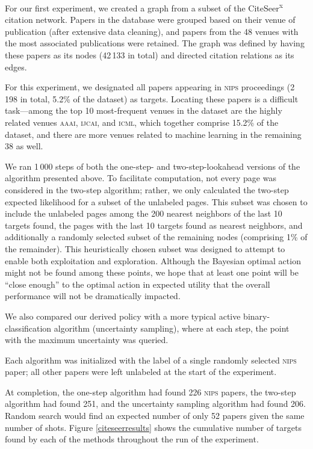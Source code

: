 \documentclass{acm_proc_article-sp}
\begin{document}
For our first experiment, we created a graph from a subset of the
CiteSeer\textsuperscript{x}\,citation network.  Papers in the database
were grouped based on their venue of publication (after extensive data
cleaning), and papers from the 48 venues with the most associated
publications were retained.  The graph was defined by having these
papers as its nodes (42\,133 in total) and directed citation
relations as its edges.

For this experiment, we designated all papers appearing in
\textsc{nips} proceedings (2\,198 in total, 5.2\% of the dataset) as
targets.  Locating these papers is a difficult task---among the top 10
most-frequent venues in the dataset are the highly related venues
\textsc{aaai}, \textsc{ijcai}, and \textsc{icml}, which together
comprise 15.2\% of the dataset, and there are more venues related to
machine learning in the remaining 38 as well.

We ran 1\,000 steps of both the one-step- and two-step-lookahead
versions of the algorithm presented above.  To facilitate computation,
not every page was considered in the two-step algorithm; rather, we
only calculated the two-step expected likelihood for a subset of the
unlabeled pages.  This subset was chosen to include the unlabeled
pages among the 200 nearest neighbors of the last 10 targets found,
the pages with the last 10 targets found as nearest neighbors, and
additionally a randomly selected subset of the remaining nodes
(comprising 1\% of the remainder).  This heuristically chosen subset
was designed to attempt to enable both exploitation and exploration.
Although the Bayesian optimal action might not be found among these
points, we hope that at least one point will be ``close enough'' to
the optimal action in expected utility that the overall performance
will not be dramatically impacted.

We also compared our derived policy with a more typical active
binary-classification algorithm (uncertainty sampling), where at each
step, the point with the maximum uncertainty was queried.

Each algorithm was initialized with the label of a single randomly
selected \textsc{nips} paper; all other papers were left unlabeled at
the start of the experiment.

At completion, the one-step algorithm had found 226 \textsc{nips}
papers, the two-step algorithm had found 251, and the uncertainty
sampling algorithm had found 206.  Random search would find an
expected number of only 52 papers given the same number of shots.
Figure \ref{citeseerresults} shows the cumulative number of targets
found by each of the methods throughout the run of the experiment.
\end{document}
